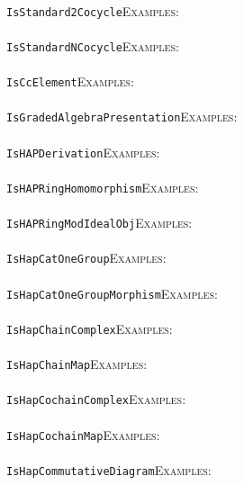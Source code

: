 \documentclass[a4paper,11pt]{report}
\begin{document}
{{ \\
 \texttt{IsStandard2Cocycle}{\nobreakspace}{\nobreakspace}{\nobreakspace}{\nobreakspace}\textsc{Examples:} \\
 \\
 \texttt{IsStandardNCocycle}{\nobreakspace}{\nobreakspace}{\nobreakspace}{\nobreakspace}\textsc{Examples:} \\
 \\
 \texttt{IsCcElement}{\nobreakspace}{\nobreakspace}{\nobreakspace}{\nobreakspace}\textsc{Examples:} \\
 \\
 \texttt{IsGradedAlgebraPresentation}{\nobreakspace}{\nobreakspace}{\nobreakspace}{\nobreakspace}\textsc{Examples:} \\
 \\
 \texttt{IsHAPDerivation}{\nobreakspace}{\nobreakspace}{\nobreakspace}{\nobreakspace}\textsc{Examples:} \\
 \\
 \texttt{IsHAPRingHomomorphism}{\nobreakspace}{\nobreakspace}{\nobreakspace}{\nobreakspace}\textsc{Examples:} \\
 \\
 \texttt{IsHAPRingModIdealObj}{\nobreakspace}{\nobreakspace}{\nobreakspace}{\nobreakspace}\textsc{Examples:} \\
 \\
 \texttt{IsHapCatOneGroup}{\nobreakspace}{\nobreakspace}{\nobreakspace}{\nobreakspace}\textsc{Examples:} \\
 \\
 \texttt{IsHapCatOneGroupMorphism}{\nobreakspace}{\nobreakspace}{\nobreakspace}{\nobreakspace}\textsc{Examples:} \\
 \\
 \texttt{IsHapChainComplex}{\nobreakspace}{\nobreakspace}{\nobreakspace}{\nobreakspace}\textsc{Examples:} \\
 \\
 \texttt{IsHapChainMap}{\nobreakspace}{\nobreakspace}{\nobreakspace}{\nobreakspace}\textsc{Examples:} \\
 \\
 \texttt{IsHapCochainComplex}{\nobreakspace}{\nobreakspace}{\nobreakspace}{\nobreakspace}\textsc{Examples:} \\
 \\
 \texttt{IsHapCochainMap}{\nobreakspace}{\nobreakspace}{\nobreakspace}{\nobreakspace}\textsc{Examples:} \\
 \\
 \texttt{IsHapCommutativeDiagram}{\nobreakspace}{\nobreakspace}{\nobreakspace}{\nobreakspace}\textsc{Examples:} \\
}}
\end{document}
